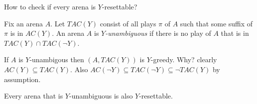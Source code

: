 \documentclass[a4paper,10pt]{article}
\begin{document}
\begin{question} 
How to check if every arena is $Y$-resettable? 
\end{question}

\begin{definition}
Fix an arena $A$.
 Let $TAC(Y)$ consist of all plays $\pi$ of $A$ such that some suffix of $\pi$ is in $AC(Y)$.
 An arena $A$ is \emph{$Y$-unambiguous} if there is no play of $A$ that is in $TAC(Y) \cap TAC(\neg Y)$.
\end{definition}

\begin{example}
 If $A$ is $Y$-unambigous then $(A,TAC(Y))$ is $Y$-greedy. Why? clearly $AC(Y) \subseteq TAC(Y)$.
 Also $AC(\neg Y) \subseteq TAC(\neg Y) \subseteq \neg TAC(Y)$ by assumption.
\end{example}

\begin{theorem} \label{thm:greedy2}
Every arena that is $Y$-unambiguous is also $Y$-resettable.
\end{theorem}
\end{document}
